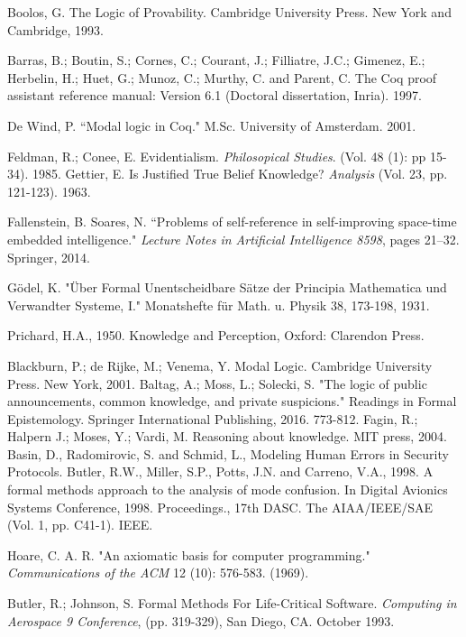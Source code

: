 \begin{thebibliography}{9}
	 	Boolos, G. The Logic of Provability. Cambridge University Press. New York and Cambridge, 1993.
	 	
	 	Barras, B.; Boutin, S.; Cornes, C.; Courant, J.; Filliatre, J.C.; Gimenez, E.; Herbelin, H.; Huet, G.; Munoz, C.; Murthy, C. and Parent, C. The Coq proof assistant reference manual: Version 6.1 (Doctoral dissertation, Inria). 1997.
	 	
	 	De Wind, P. ``Modal logic in Coq." M.Sc. University of Amsterdam. 2001.
	 	
	 	Feldman, R.; Conee, E. Evidentialism. {\em Philosopical Studies}. (Vol. 48 (1): pp 15-34). 1985.
	 	Gettier, E. Is Justified True Belief Knowledge? {\em Analysis} (Vol. 23, pp. 121-123). 1963.
	 	
	 	Fallenstein, B. Soares, N. ``Problems of self-reference in self-improving space-time embedded intelligence." {\em Lecture Notes in Artificial Intelligence 8598}, pages 21–32. Springer, 2014.
	 	
	 	
	 	 Gödel, K. "Über Formal Unentscheidbare Sätze der Principia Mathematica und Verwandter Systeme, I." Monatshefte für Math. u. Physik 38, 173-198, 1931. 
	 	 
	 	Prichard, H.A., 1950. Knowledge and Perception, Oxford: Clarendon Press.
	 	
	 	 Blackburn, P.; de Rijke, M.; Venema, Y. Modal Logic. Cambridge University Press. New York, 2001.
	 	 Baltag, A.; Moss, L.; Solecki, S. "The logic of public announcements, common knowledge, and private suspicions." Readings in Formal Epistemology. Springer International Publishing, 2016. 773-812.
	 	 Fagin, R.; Halpern J.; Moses, Y.; Vardi, M. Reasoning about knowledge. MIT press, 2004.
	 	 Basin, D., Radomirovic, S. and Schmid, L., Modeling Human Errors in Security Protocols.
	 	 Butler, R.W., Miller, S.P., Potts, J.N. and Carreno, V.A., 1998. A formal methods approach to the analysis of mode confusion. In Digital Avionics Systems Conference, 1998. Proceedings., 17th DASC. The AIAA/IEEE/SAE (Vol. 1, pp. C41-1). IEEE.
	 	
	 	
	 	Hoare, C. A. R. "An axiomatic basis for computer programming." \emph{Communications of the ACM} 12 (10): 576-583. (1969).
	 	
	 	Butler, R.; Johnson, S. Formal Methods For Life-Critical Software. \emph{Computing in Aerospace 9 Conference}, (pp. 319-329), San Diego, CA. October 1993.
	 	

\end{thebibliography}
